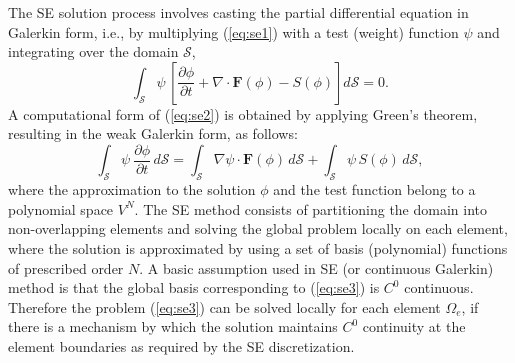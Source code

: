 \documentclass{agujournal}
\begin{document}
{%

The  SE solution process involves  casting the partial differential equation in Galerkin form, i.e.,  by multiplying  (\ref{eq:se1})  with a test (weight) function
$\psi$  and integrating over the domain $\mathcal{S}$, 
\begin{equation}
 \int_{\mathcal{S}} \psi \,  \left[ \frac{\partial \phi }{\partial t}  + \nabla \cdot \mathbf{F}(\phi) -  S(\phi)  \right]  d\mathcal{S}  = 0. \label{eq:se2} 
 \end{equation} 
A computational form of  (\ref{eq:se2})  is obtained by applying Green's theorem,  
resulting in  the weak Galerkin form, as follows: 
 \begin{equation}
 \int_{\mathcal{S}} \psi   \ \frac{\partial \phi }{\partial t} \,   d\mathcal{S}  = 
  \int_{\mathcal{S}}  \nabla  \psi \cdot \mathbf{F}(\phi) \,  d\mathcal{S}  + 
       \int_{\mathcal{S}} \psi  \, S(\phi)  \,   d\mathcal{S}, \label{eq:se3} 
 \end{equation} 
 where the approximation to the  solution $\phi$ and the test function belong to a polynomial space  $V^{N}$. 
 The SE method consists of  partitioning the domain into non-overlapping elements and solving the global problem 
 locally on each element, where the  solution is approximated by using a set of  basis (polynomial) functions of prescribed 
 order $N$.  A basic assumption used in SE (or continuous Galerkin) method is that the global basis 
 corresponding to (\ref{eq:se3}) is 
 $C^0$ continuous. 
Therefore  the problem (\ref{eq:se3}) can be solved locally for each 
 element $\Omega_e$, if there is a mechanism by which the solution maintains $C^0$ 
 continuity at the element boundaries as required 
 by the SE  discretization.   
%
 
}
\end{document}
